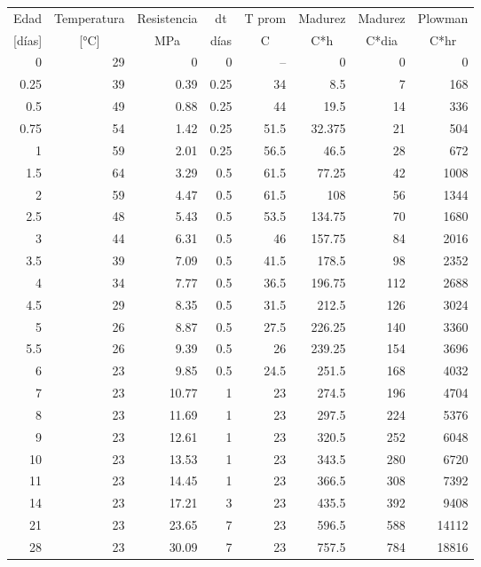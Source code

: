 \begin{table}[H]
\centering
\renewcommand{\arraystretch}{1.15}
\begin{tabular}{r r r r r r r r}
\hline
\multicolumn{1}{c}{Edad} & \multicolumn{1}{c}{Temperatura} & \multicolumn{1}{c}{Resistencia} & \multicolumn{1}{c}{dt} & \multicolumn{1}{c}{T prom} & \multicolumn{1}{c}{Madurez} & \multicolumn{1}{c}{Madurez} & \multicolumn{1}{c}{Plowman} \\
\multicolumn{1}{c}{[días]} & \multicolumn{1}{c}{[°C]} & \multicolumn{1}{c}{MPa} & \multicolumn{1}{c}{días} & \multicolumn{1}{c}{C} & \multicolumn{1}{c}{C*h} & \multicolumn{1}{c}{C*dia} & \multicolumn{1}{c}{C*hr} \\
\hline
0 & 29 & 0 & 0 & -- & 0 & 0 & 0 \\
0.25 & 39 & 0.39 & 0.25 & 34 & 8.5 & 7 & 168 \\
0.5 & 49 & 0.88 & 0.25 & 44 & 19.5 & 14 & 336 \\
0.75 & 54 & 1.42 & 0.25 & 51.5 & 32.375 & 21 & 504 \\
1 & 59 & 2.01 & 0.25 & 56.5 & 46.5 & 28 & 672 \\
1.5 & 64 & 3.29 & 0.5 & 61.5 & 77.25 & 42 & 1008 \\
2 & 59 & 4.47 & 0.5 & 61.5 & 108 & 56 & 1344 \\
2.5 & 48 & 5.43 & 0.5 & 53.5 & 134.75 & 70 & 1680 \\
3 & 44 & 6.31 & 0.5 & 46 & 157.75 & 84 & 2016 \\
3.5 & 39 & 7.09 & 0.5 & 41.5 & 178.5 & 98 & 2352 \\
4 & 34 & 7.77 & 0.5 & 36.5 & 196.75 & 112 & 2688 \\
4.5 & 29 & 8.35 & 0.5 & 31.5 & 212.5 & 126 & 3024 \\
5 & 26 & 8.87 & 0.5 & 27.5 & 226.25 & 140 & 3360 \\
5.5 & 26 & 9.39 & 0.5 & 26 & 239.25 & 154 & 3696 \\
6 & 23 & 9.85 & 0.5 & 24.5 & 251.5 & 168 & 4032 \\
7 & 23 & 10.77 & 1 & 23 & 274.5 & 196 & 4704 \\
8 & 23 & 11.69 & 1 & 23 & 297.5 & 224 & 5376 \\
9 & 23 & 12.61 & 1 & 23 & 320.5 & 252 & 6048 \\
10 & 23 & 13.53 & 1 & 23 & 343.5 & 280 & 6720 \\
11 & 23 & 14.45 & 1 & 23 & 366.5 & 308 & 7392 \\
14 & 23 & 17.21 & 3 & 23 & 435.5 & 392 & 9408 \\
21 & 23 & 23.65 & 7 & 23 & 596.5 & 588 & 14112 \\
28 & 23 & 30.09 & 7 & 23 & 757.5 & 784 & 18816 \\
\hline
\end{tabular}
\end{table}

